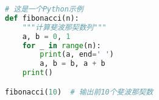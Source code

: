 \documentclass{ctexart}
\begin{document}
\begin{lstlisting}[language=Python]
# 这是一个Python示例
def fibonacci(n):
    """计算斐波那契数列"""
    a, b = 0, 1
    for _ in range(n):
        print(a, end=' ')
        a, b = b, a + b
    print()

fibonacci(10)  # 输出前10个斐波那契数
\end{lstlisting}
\end{document}
